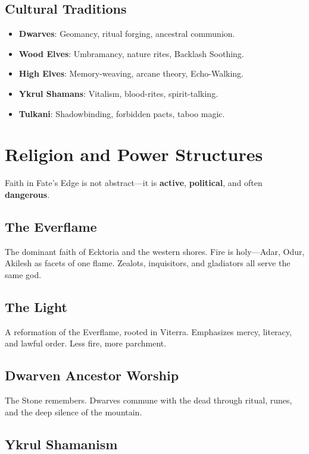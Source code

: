 \subsection*{Cultural Traditions}

\begin{itemize}
    \item \textbf{Dwarves}: Geomancy, ritual forging, ancestral communion.
    \item \textbf{Wood Elves}: Umbramancy, nature rites, Backlash Soothing.
    \item \textbf{High Elves}: Memory-weaving, arcane theory, Echo-Walking.
    \item \textbf{Ykrul Shamans}: Vitalism, blood-rites, spirit-talking.
    \item \textbf{Tulkani}: Shadowbinding, forbidden pacts, taboo magic.
\end{itemize}

\section*{Religion and Power Structures}

Faith in Fate’s Edge is not abstract—it is \textbf{active}, \textbf{political}, and often \textbf{dangerous}.

\subsection*{The Everflame}

The dominant faith of Ecktoria and the western shores. Fire is holy—Adar, Odur, Akilesh as facets of one flame. Zealots, inquisitors, and gladiators all serve the same god.

\subsection*{The Light}

A reformation of the Everflame, rooted in Viterra. Emphasizes mercy, literacy, and lawful order. Less fire, more parchment.

\subsection*{Dwarven Ancestor Worship}

The Stone remembers. Dwarves commune with the dead through ritual, runes, and the deep silence of the mountain.

\subsection*{Ykrul Shamanism}

